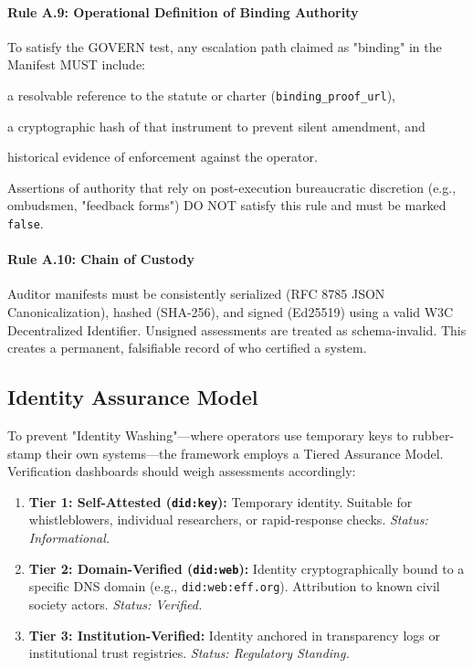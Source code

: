 \documentclass{article}
\begin{document}
\paragraph{Rule A.9: Operational Definition of Binding Authority}
To satisfy the GOVERN test, any escalation path claimed as "binding" in the Manifest MUST include:
\begin{enumerate*}[label=(\roman*)]
    \item a resolvable reference to the statute or charter (\texttt{binding\_proof\_url}),
    \item a cryptographic hash of that instrument to prevent silent amendment, and
    \item historical evidence of enforcement against the operator.
\end{enumerate*}
Assertions of authority that rely on post-execution bureaucratic discretion (e.g., ombudsmen, "feedback forms") DO NOT satisfy this rule and must be marked \texttt{false}.

\paragraph{Rule A.10: Chain of Custody}
Auditor manifests must be consistently serialized (RFC 8785 JSON Canonicalization), hashed (SHA-256), and signed (Ed25519) using a valid W3C Decentralized Identifier. Unsigned assessments are treated as schema-invalid. This creates a permanent, falsifiable record of who certified a system.

\subsection{Identity Assurance Model}

To prevent "Identity Washing"---where operators use temporary keys to rubber-stamp their own systems---the framework employs a Tiered Assurance Model. Verification dashboards should weigh assessments accordingly:

\begin{enumerate}
    \item \textbf{Tier 1: Self-Attested (\texttt{did:key}):} Temporary identity. Suitable for whistleblowers, individual researchers, or rapid-response checks. \textit{Status: Informational.}
    \item \textbf{Tier 2: Domain-Verified (\texttt{did:web}):} Identity cryptographically bound to a specific DNS domain (e.g., \texttt{did:web:eff.org}). Attribution to known civil society actors. \textit{Status: Verified.}
    \item \textbf{Tier 3: Institution-Verified:} Identity anchored in transparency logs or institutional trust registries. \textit{Status: Regulatory Standing.}
\end{enumerate}
\end{document}
